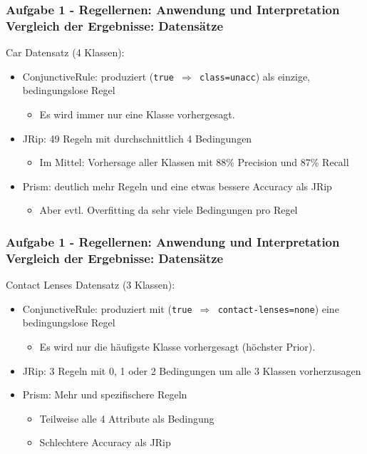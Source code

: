 \documentclass[accentcolor=tud6b,colorbacktitle,inverttitle,landscape,german,presentation,t]{tudbeamer}
\begin{document}
    \begin{frame}[t]
    \frametitle{Aufgabe 1 - Regellernen: Anwendung und Interpretation\\ Vergleich der Ergebnisse: Datensätze}
        Car Datensatz (4 Klassen):
      
        \begin{itemize}
            \item ConjunctiveRule: produziert (\texttt{true $\Rightarrow$ class=unacc}) als einzige, bedingungslose Regel            
            \begin{itemize}
                \item Es wird immer nur eine Klasse vorhergesagt.
            \end{itemize}
            \item JRip: 49 Regeln mit durchschnittlich 4 Bedingungen 
            \begin{itemize}
                \item Im Mittel: Vorhersage aller Klassen mit 88\% Precision und 87\% Recall
            \end{itemize}
            \item Prism: deutlich mehr Regeln und eine etwas bessere Accuracy als JRip 
            \begin{itemize}
                \item  Aber evtl. Overfitting da sehr viele Bedingungen pro Regel
            \end{itemize}
        \end{itemize}
    \end{frame}
    
     \begin{frame}[t]
    \frametitle{Aufgabe 1 - Regellernen: Anwendung und Interpretation\\ Vergleich der Ergebnisse: Datensätze}
        Contact Lenses Datensatz (3 Klassen):
        \begin{itemize}
            \item ConjunctiveRule: produziert mit (\texttt{true $\Rightarrow$ contact-lenses=none}) eine bedingungslose Regel
            \begin{itemize}
                \item Es wird nur die häufigste Klasse vorhergesagt (höchster Prior).
            \end{itemize}
            \item JRip: 3 Regeln mit 0, 1 oder 2 Bedingungen um alle 3 Klassen vorherzusagen
            \item Prism: Mehr und spezifischere Regeln 
            \begin{itemize}
                \item Teilweise alle 4 Attribute als Bedingung
                \item Schlechtere Accuracy als JRip
            \end{itemize}
        \end{itemize}
    \end{frame}
    
\end{document}
